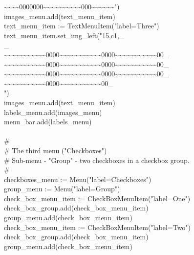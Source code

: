 {\>\>\~{}\~{}\~{}\~{}0000000\~{}\~{}\~{}\~{}\~{}\~{}\~{}\~{}\~{}\~{}000\~{}\~{}\~{}\~{}\~{}\~{}") \\
\>\>images\_menu.add(text\_menu\_item) \\
\>\>text\_menu\_item := TextMenuItem("label=Three") \\
\>\>text\_menu\_item.set\_img\_left("15,c1,\_ \\
\>\_ \\
\>\~{}\~{}\~{}\~{}\~{}\~{}\~{}\~{}\~{}\~{}\~{}0000\~{}\~{}\~{}\~{}\~{}\~{}\~{}\~{}\~{}\~{}\~{}0000\~{}\~{}\~{}\~{}\~{}\~{}\~{}\~{}\~{}\~{}\~{}00\_ \\
\>\~{}\~{}\~{}\~{}\~{}\~{}\~{}\~{}\~{}\~{}\~{}0000\~{}\~{}\~{}\~{}\~{}\~{}\~{}\~{}\~{}\~{}\~{}0000\~{}\~{}\~{}\~{}\~{}\~{}\~{}\~{}\~{}\~{}\~{}00\_ \\
\>\~{}\~{}\~{}\~{}\~{}\~{}\~{}\~{}\~{}\~{}\~{}0000\~{}\~{}\~{}\~{}\~{}\~{}\~{}\~{}\~{}\~{}\~{}0000\~{}\~{}\~{}\~{}\~{}\~{}\~{}\~{}\~{}\~{}\~{}00\_ \\
\>\~{}\~{}\~{}\~{}\~{}\~{}\~{}\~{}\~{}\~{}\~{}0000\~{}\~{}\~{}\~{}\~{}\~{}\~{}\~{}\~{}\~{}\~{}00\_ \\
\>") \\
\>\>images\_menu.add(text\_menu\_item) \\
\>\>labels\_menu.add(images\_menu) \\
\>\>menu\_bar.add(labels\_menu) \\
\ \\
\>\>\# \\
\>\>\# The third menu ("Checkboxes") \\
\>\>\# Sub-menu - "Group" - two checkboxes in a checkbox group. \\
\>\>\# \\
\>\>checkboxes\_menu := Menu("label=Checkboxes") \\
\>\>group\_menu := Menu("label=Group") \\
\>\>check\_box\_menu\_item := CheckBoxMenuItem("label=One") \\
\>\>check\_box\_group.add(check\_box\_menu\_item) \\
\>\>group\_menu.add(check\_box\_menu\_item) \\
\>\>check\_box\_menu\_item := CheckBoxMenuItem("label=Two") \\
\>\>check\_box\_group.add(check\_box\_menu\_item) \\
\>\>group\_menu.add(check\_box\_menu\_item) \\
}
